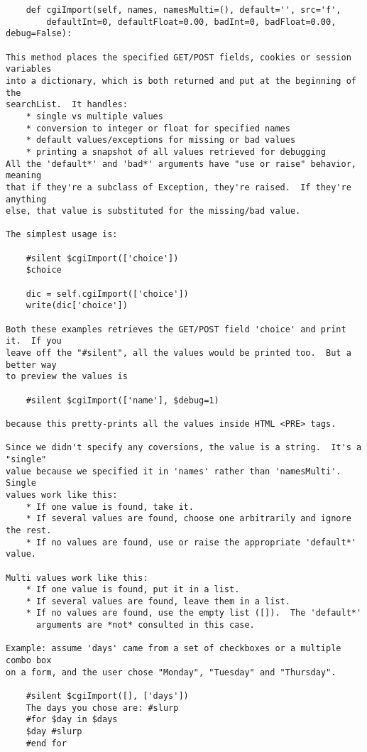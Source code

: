 \begin{verbatim}
    def cgiImport(self, names, namesMulti=(), default='', src='f',
        defaultInt=0, defaultFloat=0.00, badInt=0, badFloat=0.00, debug=False):

This method places the specified GET/POST fields, cookies or session variables
into a dictionary, which is both returned and put at the beginning of the
searchList.  It handles:
    * single vs multiple values
    * conversion to integer or float for specified names
    * default values/exceptions for missing or bad values
    * printing a snapshot of all values retrieved for debugging
All the 'default*' and 'bad*' arguments have "use or raise" behavior, meaning 
that if they're a subclass of Exception, they're raised.  If they're anything
else, that value is substituted for the missing/bad value.  

The simplest usage is:

    #silent $cgiImport(['choice'])
    $choice

    dic = self.cgiImport(['choice'])
    write(dic['choice'])

Both these examples retrieves the GET/POST field 'choice' and print it.  If you
leave off the "#silent", all the values would be printed too.  But a better way
to preview the values is

    #silent $cgiImport(['name'], $debug=1)

because this pretty-prints all the values inside HTML <PRE> tags.

Since we didn't specify any coversions, the value is a string.  It's a "single"
value because we specified it in 'names' rather than 'namesMulti'.  Single
values work like this:
    * If one value is found, take it.
    * If several values are found, choose one arbitrarily and ignore the rest.
    * If no values are found, use or raise the appropriate 'default*' value.

Multi values work like this:
    * If one value is found, put it in a list.
    * If several values are found, leave them in a list.
    * If no values are found, use the empty list ([]).  The 'default*' 
      arguments are *not* consulted in this case.

Example: assume 'days' came from a set of checkboxes or a multiple combo box
on a form, and the user chose "Monday", "Tuesday" and "Thursday".

    #silent $cgiImport([], ['days'])
    The days you chose are: #slurp
    #for $day in $days
    $day #slurp
    #end for


\end{verbatim}
